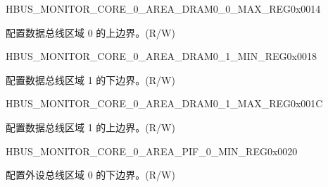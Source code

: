 \begin{register}{H}{BUS\_MONITOR\_CORE\_0\_AREA\_DRAM0\_0\_MAX\_REG}{0x0014}\label{regdesc:BUSMONITORCORE0AREADRAM00MAXREG}
%
\regnewline%
\begin{regdesc}\begin{reglist}
\label{fielddesc:BUSMONITORCORE0AREADRAM00MAX}\item [BUS\_MONITOR\_CORE\_0\_AREA\_DRAM0\_0\_MAX] 配置数据总线区域 0 的上边界。(R/W)
\end{reglist}\end{regdesc}
\end{register}


\begin{register}{H}{BUS\_MONITOR\_CORE\_0\_AREA\_DRAM0\_1\_MIN\_REG}{0x0018}\label{regdesc:BUSMONITORCORE0AREADRAM01MINREG}
%
\regnewline%
\begin{regdesc}\begin{reglist}
\label{fielddesc:BUSMONITORCORE0AREADRAM01MIN}\item [BUS\_MONITOR\_CORE\_0\_AREA\_DRAM0\_1\_MIN] 配置数据总线区域 1 的下边界。(R/W)
\end{reglist}\end{regdesc}
\end{register}


\begin{register}{H}{BUS\_MONITOR\_CORE\_0\_AREA\_DRAM0\_1\_MAX\_REG}{0x001C}\label{regdesc:BUSMONITORCORE0AREADRAM01MAXREG}
%
\regnewline%
\begin{regdesc}\begin{reglist}
\label{fielddesc:BUSMONITORCORE0AREADRAM01MAX}\item [BUS\_MONITOR\_CORE\_0\_AREA\_DRAM0\_1\_MAX] 配置数据总线区域 1 的上边界。(R/W)
\end{reglist}\end{regdesc}
\end{register}


\begin{register}{H}{BUS\_MONITOR\_CORE\_0\_AREA\_PIF\_0\_MIN\_REG}{0x0020}\label{regdesc:BUSMONITORCORE0AREAPIF0MINREG}
%
\regnewline%
\begin{regdesc}\begin{reglist}
\label{fielddesc:BUSMONITORCORE0AREAPIF0MIN}\item [BUS\_MONITOR\_CORE\_0\_AREA\_PIF\_0\_MIN] 配置外设总线区域 0 的下边界。(R/W)
\end{reglist}\end{regdesc}
\end{register}


